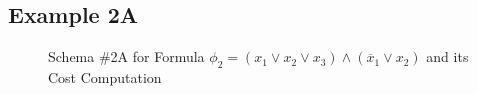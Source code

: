 \documentclass{llncs}
\newcommand{\obar}[1]{\overline{#1}}
\begin{document}
\subsection{Example 2A}

\begin{figure}
  \caption{Schema \#2A for Formula $\phi_2 = (x_1 \lor x_2 \lor x_3) \land (\obar{x}_1 \lor x_2)$ and its Cost Computation}
\label{fig:p2-bdd:schema}
\end{figure}
\end{document}
